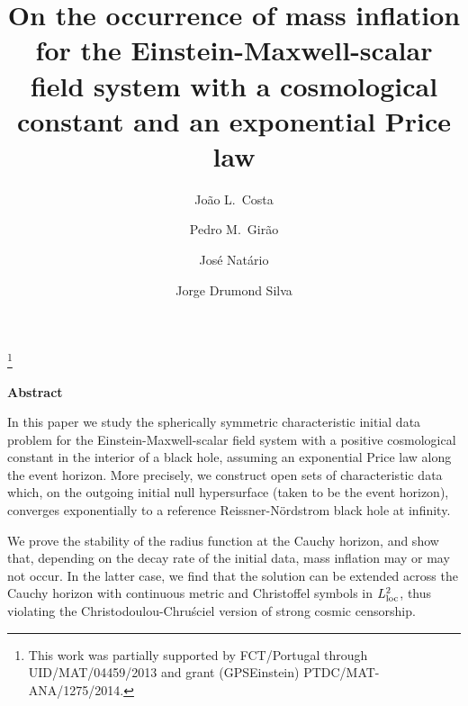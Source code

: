 \documentclass[a4paper,11pt,oneside,reqno]{amsart}
\begin{document}

\title[Occurrence of mass inflation with an exponential Price law]{On the occurrence of mass inflation for the Einstein-Maxwell-scalar field system with a cosmological constant and an exponential Price law}

\author{Jo\~ao L.~Costa}
\author{Pedro M.~Gir\~ao}
\author{Jos\'{e} Nat\'{a}rio}
\author{Jorge Drumond Silva}

\address{Jo\~ao L.~Costa: ISCTE - Instituto Universitário de Lisboa, Av.\ das Forças Armadas, 1649-026 Lisboa, Portugal and CAMGSD}
\address{Pedro M.~Gir\~ao, Jos\'{e} Nat\'{a}rio and Jorge Drumond Silva: CAMGSD, Instituto Superior T\'ecnico, Universidade de Lisboa, Av.\ Rovisco Pais, 1049-001 Lisboa, Portugal}

\thanks{This work was partially supported by FCT/Portugal through UID/MAT/04459/2013 and grant (GPSEinstein) PTDC/MAT-ANA/1275/2014.}

\maketitle

\begin{center}
{\bf Abstract}
\end{center}

In this paper we study the spherically symmetric characteristic initial data problem for the Einstein-Maxwell-scalar
field system with a positive cosmological constant in the interior of a black hole, assuming an exponential Price law
along the event horizon. More precisely, we construct open sets of characteristic data which, on the outgoing initial null hypersurface  
(taken to be the event horizon), converges exponentially to a reference Reissner-N\"{o}rdstrom black hole at infinity.

We prove the stability of the radius function at the Cauchy horizon, and show that, depending on the decay rate of the initial data, mass inflation 
may or may not occur. In the latter case, we find that the solution can be extended across the Cauchy horizon with continuous metric and Christoffel symbols in $L^2_{{\rm loc}}$, 
thus violating the Christodoulou-Chru\'sciel version of strong cosmic censorship.
\end{document}
